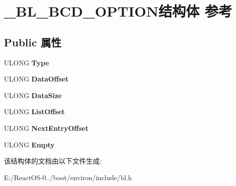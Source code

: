 \hypertarget{struct___b_l___b_c_d___o_p_t_i_o_n}{}\section{\+\_\+\+B\+L\+\_\+\+B\+C\+D\+\_\+\+O\+P\+T\+I\+O\+N结构体 参考}
\label{struct___b_l___b_c_d___o_p_t_i_o_n}
\subsection*{Public 属性}
\begin{DoxyCompactItemize}
\item 
\mbox{\label{struct___b_l___b_c_d___o_p_t_i_o_n_ac6d6728ffddeb5be8eef8c82a9931bea}} 
U\+L\+O\+NG {\bfseries Type}
\item 
\mbox{\label{struct___b_l___b_c_d___o_p_t_i_o_n_aef0e05ff79625fff16dfd798ccbec188}} 
U\+L\+O\+NG {\bfseries Data\+Offset}
\item 
\mbox{\label{struct___b_l___b_c_d___o_p_t_i_o_n_a1c32cee46653b65aeff70818c962bb26}} 
U\+L\+O\+NG {\bfseries Data\+Size}
\item 
\mbox{\label{struct___b_l___b_c_d___o_p_t_i_o_n_a39c966ba0aa40378bac6ece2f1a5e5a9}} 
U\+L\+O\+NG {\bfseries List\+Offset}
\item 
\mbox{\label{struct___b_l___b_c_d___o_p_t_i_o_n_ac62d66e2ac93e2ce96504ddc0d66c150}} 
U\+L\+O\+NG {\bfseries Next\+Entry\+Offset}
\item 
\mbox{\label{struct___b_l___b_c_d___o_p_t_i_o_n_a4ed7e4c443f4f42a35cc4008cfb84b53}} 
U\+L\+O\+NG {\bfseries Empty}
\end{DoxyCompactItemize}


该结构体的文档由以下文件生成\+:\begin{DoxyCompactItemize}
\item 
E\+:/\+React\+O\+S-\/0../boot/environ/include/bl.\+h\end{DoxyCompactItemize}
